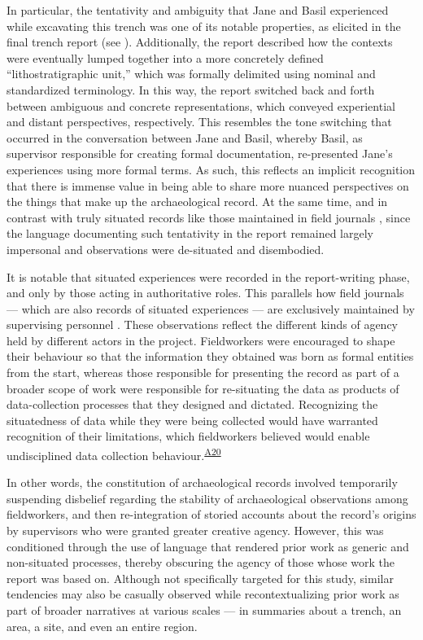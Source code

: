 \documentclass[
]{article}
\begin{document}
In particular, the tentativity and ambiguity that Jane and Basil
experienced while excavating this trench was one of its notable
properties, as elicited in the final trench report (see
\textcite{fig-context-report}). Additionally, the report described how
the contexts were eventually lumped together into a more concretely
defined ``lithostratigraphic unit,'' which was formally delimited using
nominal and standardized terminology. In this way, the report switched
back and forth between ambiguous and concrete representations, which
conveyed experiential and distant perspectives, respectively. This
resembles the tone switching that occurred in the conversation between
Jane and Basil, whereby Basil, as supervisor responsible for creating
formal documentation, re-presented Jane's experiences using more formal
terms. As such, this reflects an implicit recognition that there is
immense value in being able to share more nuanced perspectives on the
things that make up the archaeological record. At the same time, and in
contrast with truly situated records like those maintained in field
journals \autocite[cf.][]{batist2024a}, since the language documenting
such tentativity in the report remained largely impersonal and
observations were de-situated and disembodied.

It is notable that situated experiences were recorded in the
report-writing phase, and only by those acting in authoritative roles.
This parallels how field journals --- which are also records of situated
experiences --- are exclusively maintained by supervising personnel
\autocite{batist2024a}. These observations reflect the different kinds
of agency held by different actors in the project. Fieldworkers were
encouraged to shape their behaviour so that the information they
obtained was born as formal entities from the start, whereas those
responsible for presenting the record as part of a broader scope of work
were responsible for re-situating the data as products of
data-collection processes that they designed and dictated. Recognizing
the situatedness of data while they were being collected would have
warranted recognition of their limitations, which fieldworkers believed
would enable undisciplined data collection
behaviour.\textsuperscript{\hyperref[sec-A20]{A20}}

In other words, the constitution of archaeological records involved
temporarily suspending disbelief regarding the stability of
archaeological observations among fieldworkers, and then re-integration
of storied accounts about the record's origins by supervisors who were
granted greater creative agency. However, this was conditioned through
the use of language that rendered prior work as generic and non-situated
processes, thereby obscuring the agency of those whose work the report
was based on. Although not specifically targeted for this study, similar
tendencies may also be casually observed while recontextualizing prior
work as part of broader narratives at various scales --- in summaries
about a trench, an area, a site, and even an entire region.

\printbibliography
\end{document}
